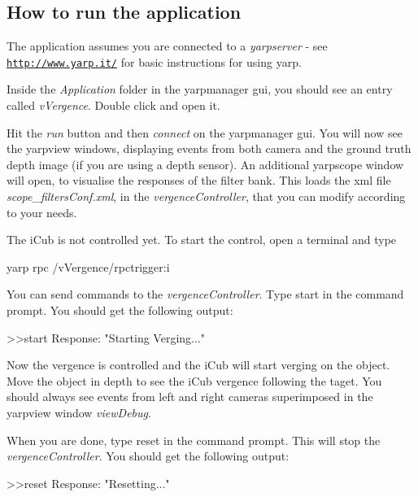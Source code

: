 \subsection*{How to run the application}

The application assumes you are connected to a {\itshape yarpserver} -\/ see \href{http://www.yarp.it/}{\tt http\+://www.\+yarp.\+it/} for basic instructions for using yarp.

Inside the {\itshape Application} folder in the yarpmanager gui, you should see an entry called {\itshape v\+Vergence}. Double click and open it.

Hit the {\itshape run} button and then {\itshape connect} on the yarpmanager gui. You will now see the yarpview windows, displaying events from both camera and the ground truth depth image (if you are using a depth sensor). An additional yarpscope window will open, to visualise the responses of the filter bank. This loads the xml file {\itshape scope\+\_\+filters\+Conf.\+xml}, in the {\itshape vergence\+Controller}, that you can modify according to your needs.

The i\+Cub is not controlled yet. To start the control, open a terminal and type \begin{DoxyVerb}    yarp rpc /vVergence/rpctrigger:i
\end{DoxyVerb}


You can send commands to the {\itshape vergence\+Controller}. Type {\ttfamily start} in the command prompt. You should get the following output\+: \begin{DoxyVerb}    >>start
    Response: "Starting Verging..."
\end{DoxyVerb}


Now the vergence is controlled and the i\+Cub will start verging on the object. Move the object in depth to see the i\+Cub vergence following the taget. You should always see events from left and right cameras superimposed in the yarpview window {\itshape view\+Debug}.

When you are done, type {\ttfamily reset} in the command prompt. This will stop the {\itshape vergence\+Controller}. You should get the following output\+: \begin{DoxyVerb}    >>reset
    Response: "Resetting..."\end{DoxyVerb}
 